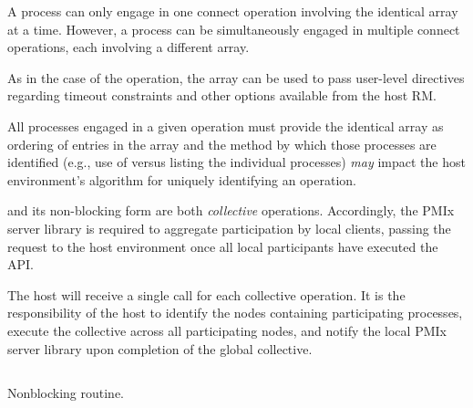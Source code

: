 A process can only engage in one connect operation involving the identical  array at a time.
However, a process can be simultaneously engaged in multiple connect operations, each involving a different  array.

As in the case of the  operation, the  array can be used to pass user-level directives regarding timeout constraints and other options available from the host \ac{RM}.

\adviceuserstart
All processes engaged in a given  operation must provide the identical  array as ordering of entries in the array and the method by which those processes are identified (e.g., use of  versus listing the individual processes) \textit{may} impact the host environment's algorithm for uniquely identifying an operation.
\adviceuserend

\adviceimplstart
{} and its non-blocking form are both \emph{collective} operations. Accordingly, the \ac{PMIx} server library is required to aggregate participation by local clients, passing the request to the host environment once all local participants have executed the \ac{API}.
\adviceimplend

\advicermstart
The host will receive a single call for each collective operation. It is the responsibility of the host to identify the nodes containing participating processes, execute the collective across all participating nodes, and notify the local \ac{PMIx} server library upon completion of the global collective.
\advicermend


\subsection{}

\summary

Nonblocking  routine.

\format


